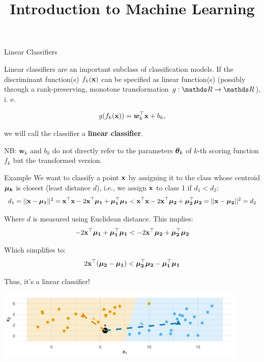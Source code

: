 \documentclass[11pt,compress,t,notes=noshow, xcolor=table]{beamer}
\title{Introduction to Machine Learning}
\begin{document}

\framebreak


\begin{vbframe}{Linear Classifiers}

Linear classifiers are an important subclass of classification models. 
If the discriminant function(s) $\fkx$ can be specified as linear function(s) (possibly through a rank-preserving,
monotone transformation $g: \R \to \R$), i. e. 

$$
  g(\fkx) = \bm{w}_k^\top \xv + b_k,
$$

we will call the classifier a \textbf{linear classifier}. 

\vfill

NB: $\bm{w}_k$ and $b_k$ do not directly refer to the parameters $\thetav_k$ 
of $k$-th scoring function $f_k$ but the transformed version. 

\end{vbframe}

\begin{vbframe}{Example}
We want to classify a point $\xv$ by assigning it to the class whose centroid $\muk$ is closest (least distance $d$), i.e., we assign $\xv$ to class 1 if $d_1 < d_2$:
$$
d_1 = ||\xv - \muk[1]||^2 = \xv^\top \xv - 2 \xv^\top \muk[1] + \muk[1]^\top \muk[1]
< \xv^\top \xv - 2 \xv^\top \muk[2] + \muk[2]^\top \muk[2] = ||\xv - \muk[2]||^2 = d_2
$$

Where $d$ is measured using Euclidean distance. This implies:
$$
-2 \xv^\top \muk[1] + \muk[1]^\top \muk[1]
< -2 \xv^\top \muk[2] + \muk[2]^\top \muk[2]
$$

Which simplifies to:
$$
2 \xv^\top (\muk[2] - \muk[1]) < \muk[2]^\top \muk[2] - \muk[1]^\top \muk[1]
$$

Thus, it's a linear classifier!
\vspace{-0.85em}
\begin{center}
\includegraphics[width=0.9\textwidth]{figure/nearest_centroid_classifier.png} 
\end{center}

\end{vbframe}
  
\end{document}
